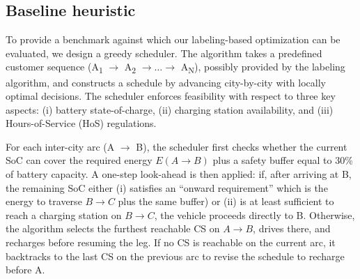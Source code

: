 \documentclass[3p,11pt,authoryear]{elsarticle}  %
\begin{document}

    

\subsection{Baseline heuristic }


To provide a benchmark against which our labeling-based optimization can be evaluated, we design a greedy scheduler. The algorithm takes a predefined customer sequence (A\textsubscript{1} $\rightarrow$ A\textsubscript{2} $\rightarrow \dots \rightarrow$ A\textsubscript{N}), possibly provided by the labeling algorithm, and constructs a schedule by advancing city-by-city with locally optimal decisions. The scheduler enforces feasibility with respect to three key aspects: (i) battery state-of-charge, (ii) charging station availability, and (iii) Hours-of-Service (HoS) regulations.


For each inter-city arc (A $\rightarrow$ B), the scheduler first checks whether the current SoC can cover the required energy $E(A\!\rightarrow\!B)$ plus a safety buffer equal to $30\%$ of battery capacity. A one-step look-ahead is then applied: if, after arriving at B, the remaining SoC either (i) satisfies an “onward requirement” which is the energy to traverse $B\!\rightarrow\!C$ plus the same buffer) or (ii) is at least sufficient to reach a charging station on $B\!\rightarrow\!C$, the vehicle proceeds directly to B. Otherwise, the algorithm selects the furthest reachable CS on $A\!\rightarrow\!B$, drives there, and recharges before resuming the leg. If no CS is reachable on the current arc, it backtracks to the last CS on the previous arc to revise the schedule to recharge before A.
\end{document}
